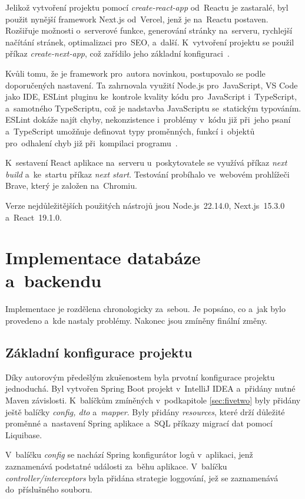 \documentclass[twoside]{ctuthesis}
\begin{document}
Jelikož vytvoření projektu pomocí \emph{create-react-app} od~Reactu je zastaralé, byl použit nynější framework Next.js od~Vercel, jenž je na~Reactu postaven. Rozšiřuje možnosti o~serverové funkce, generování stránky na~serveru, rychlejší načítání stránek, optimalizaci pro~SEO, a~další. K~vytvoření projektu se použil příkaz \emph{create-next-app}, což zařídilo jeho základní konfiguraci~\cite{nextjs}.

Kvůli tomu, že je framework pro~autora novinkou, postupovalo se podle doporučených nastavení. Ta zahrnovala využití Node.js pro~JavaScript, VS Code jako IDE, ESLint pluginu ke~kontrole kvality kódu pro~JavaScript i~TypeScript, a~samotného TypeScriptu, což je nadstavba JavaScriptu se~statickým typováním. ESLint dokáže najít chyby, nekonzistence i~problémy v~kódu již při~jeho psaní a~TypeScript umožňuje definovat typy proměnných, funkcí i~objektů pro~odhalení chyb již při~kompilaci programu~\cite{eslint, typescript}.

K~sestavení React aplikace na~serveru u~poskytovatele se využívá příkaz \emph{next build} a~ke~startu příkaz \emph{next start}. Testování probíhalo ve~webovém prohlížeči Brave, který je založen na~Chromiu.

Verze nejdůležitějších použitých nástrojů jsou Node.js~22.14.0, Next.js~15.3.0 a~React~19.1.0.

\section{Implementace databáze a~backendu}
\label{sec:sixthree}

Implementace je rozdělena chronologicky za~sebou. Je popsáno, co a~jak bylo provedeno a~kde nastaly problémy. Nakonec jsou zmíněny finální změny.

\subsection{Základní konfigurace projektu}

Díky autorovým předešlým zkušenostem byla prvotní konfigurace projektu jednoduchá. Byl vytvořen Spring Boot projekt v~IntelliJ IDEA a~přidány nutné Maven závislosti. K~balíčkům zmíněných v~podkapitole \ref{sec:fivetwo} byly přidány ještě balíčky \emph{config, dto} a~\emph{mapper}. Byly přidány \emph{resources}, které drží důležité proměnné a~nastavení Spring aplikace a~SQL příkazy migrací dat pomocí Liquibase.

V~balíčku \emph{config} se nachází Spring konfigurátor logů v~aplikaci, jenž zaznamenává podstatné události za~běhu aplikace. V~balíčku \emph{controller/interceptors} byla přidána strategie loggování, jež se zaznamenává do~příslušného souboru.
\end{document}
